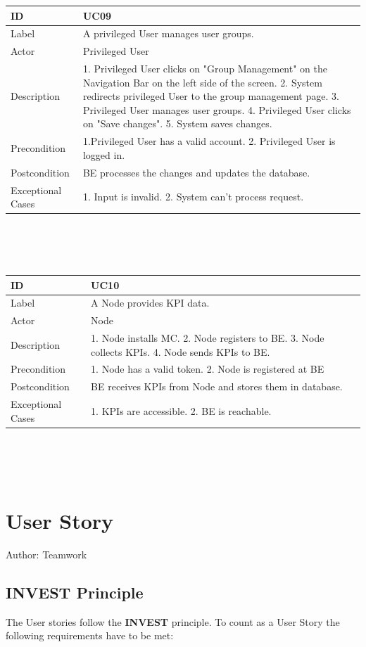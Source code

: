 \documentclass{scrreprt}
\begin{document}
\begin{tabularx}{12cm}{l|X}
ID & UC09  \\
\hline
Label & 
A privileged User manages user groups. \\
\hline
Actor            & Privileged User    \\
\hline
Description            &  1. Privileged User clicks on "Group Management" on the Navigation Bar on the left side of the screen. 2. System redirects privileged User to the group management page. 3. Privileged User manages user groups. 4. Privileged User clicks on "Save changes". 5. System saves changes. 
\\
\hline
Precondition           & 1.Privileged User has a valid account. 2. Privileged User is logged in.  \\
\hline
Postcondition     &  BE processes the changes and updates the database. \\
\hline
Exceptional Cases & 1. Input is invalid. 2. System can't process request. 	
\end{tabularx}
\\
\\ \\
\begin{tabularx}{12cm}{l|X}
	ID & UC10  \\
	\hline
	Label & 
	A Node provides KPI data. \\
	\hline
	Actor            & Node    \\
	\hline
	Description            &  1. Node installs MC. 2. Node registers to BE. 3. Node collects KPIs. 4. Node sends KPIs to BE.
	\\
	\hline
	Precondition           & 1. Node has a valid token. 2. Node is registered at BE  \\
	\hline
	Postcondition     &  BE receives KPIs from Node and stores them in database. \\
	\hline
	Exceptional Cases & 1. KPIs are accessible. 2. BE is reachable. 	
\end{tabularx}
\\
\\ \\
\section{User Story}
Author: Teamwork
\subsection{INVEST Principle}
The User stories follow the \textbf{INVEST} principle. To count as a User Story the following requirements have to be met: 
\end{document}
